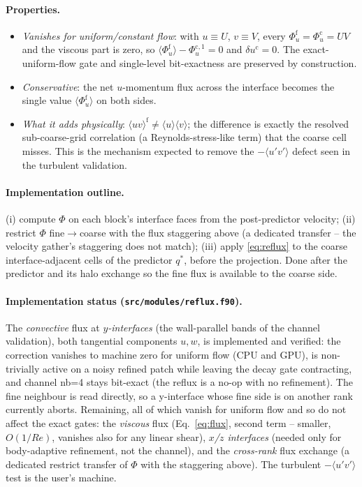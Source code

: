 \documentclass[11pt]{article}
\newcommand{\fine}{\mathrm{f}}
\newcommand{\coarse}{\mathrm{c}}
\begin{document}
\paragraph{Properties.}
\begin{itemize}
\item \emph{Vanishes for uniform/constant flow}: with $u\equiv U$, $v\equiv V$,
  every $\Phi_u^{\fine}=\Phi_u^{\coarse}=UV$ and the viscous part is zero, so
  $\langle\Phi_u^{\fine}\rangle-\Phi_u^{\coarse,1}=0$ and
  $\delta u^\coarse=0$. The exact-uniform-flow gate and single-level
  bit-exactness are preserved by construction.
\item \emph{Conservative}: the net $u$-momentum flux across the interface
  becomes the single value $\langle\Phi_u^{\fine}\rangle$ on both sides.
\item \emph{What it adds physically}: $\langle uv\rangle^{\fine}\ne
  \langle u\rangle\langle v\rangle$; the difference is exactly the resolved
  sub-coarse-grid correlation (a Reynolds-stress-like term) that the coarse
  cell misses. This is the mechanism expected to remove the
  $-\langle u'v'\rangle$ defect seen in the turbulent validation.
\end{itemize}

\paragraph{Implementation outline.} (i) compute $\Phi$ on each block's
interface faces from the post-predictor velocity; (ii) restrict $\Phi$
fine$\to$coarse with the flux staggering above (a dedicated transfer -- the
velocity gather's staggering does not match); (iii) apply \eqref{eq:reflux} to
the coarse interface-adjacent cells of the predictor $q^\ast$, before the
projection. Done after the predictor and its halo exchange so the fine flux is
available to the coarse side.

\paragraph{Implementation status (\texttt{src/modules/reflux.f90}).} The
\emph{convective} flux at \emph{$y$-interfaces} (the wall-parallel bands of the
channel validation), both tangential components $u,w$, is implemented and
verified: the correction vanishes to machine zero for uniform flow (CPU and
GPU), is non-trivially active on a noisy refined patch while leaving the decay
gate contracting, and channel nb=4 stays bit-exact (the reflux is a no-op with
no refinement). The fine neighbour is read directly, so a y-interface whose
fine side is on another rank currently aborts. Remaining, all of which vanish
for uniform flow and so do not affect the exact gates: the \emph{viscous} flux
(Eq.~\ref{eq:flux}, second term -- smaller, $O(1/Re)$, vanishes also for any
linear shear), \emph{$x$/$z$ interfaces} (needed only for body-adaptive
refinement, not the channel), and the \emph{cross-rank} flux exchange (a
dedicated restrict transfer of $\Phi$ with the staggering above). The turbulent
$-\langle u'v'\rangle$ test is the user's machine.
\end{document}
